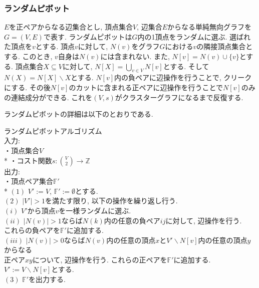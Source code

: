 \documentclass[10.5,a4paper,titlepage, dvipdfmx]{bxjsarticle}
\begin{document}
\subsubsection{ランダムピボット}
$E$を正ペアからなる辺集合とし, 頂点集合$V$, 辺集合$E$からなる単純無向グラフを$G=(V,E)$で表す.
ランダムピボットは$G$内の1頂点をランダムに選ぶ.
選ばれた頂点を$v$とする.
頂点$v$に対して, $N(v)$をグラフ$G$における$v$の隣接頂点集合とする.
このとき, $v$自身は$N(v)$には含まれない.
また, $N[v]= N(v) \cup \{v\}$とする.
頂点集合$X \subseteq V$に対して, $N[X] = \bigcup_{v \in V} N[v]$とする. そして$N(X) = N[X] \backslash X$とする.
$N[v]$内の負ペアに辺操作を行うことで, クリークにする.
その後$N[v]$のカットに含まれる正ペアに辺操作を行うことで$N[v]$のみの連結成分ができる.
これを$(V,s)$がクラスターグラフになるまで反復する.\par
ランダムピボットの詳細は以下のとおりである.
\begin{screen}
    $\textbf{ランダムピボットアルゴリズム}$ \\
    入力: \\
    \hspace{15pt} ・頂点集合$V$\\*
    \hspace{15pt} ・コスト関数$s:\binom{V}{2} \rightarrow \mathbb{Z}$\\
    出力: \\
    \hspace{15pt} ・頂点ペア集合$\mathbb{F'}$\\*
    $(1)$ $V':=V$, $\mathbb{F'}:= \emptyset$とする.\\
    $(2)$ $|V'| > 1$を満たす限り, 以下の操作を繰り返し行う.\\
    \hspace{15pt} $(i)$ $V'$から頂点$v$を一様ランダムに選ぶ.\\
    \hspace{15pt} $(ii)$ $|N(v)| > 1$ならば$N(k)$内の任意の負ペア$ij$に対して, 辺操作を行う.\\
    \hspace{15pt} \hspace{15pt} これらの負ペアを$\mathbb{F'}$に追加する.\\
    \hspace{15pt} $(iii)$ $|N(v)|>0$ならば$N(v)$内の任意の頂点$x$と$V' \backslash N[v]$内の任意の頂点$y$からなる\\
    \hspace{15pt} \hspace{15pt} 正ペア$xy$について, 辺操作を行う. これらの正ペアを$\mathbb{F'}$に追加する. $V':=V \backslash N[v]$とする.\\
    $(3)$ $\mathbb{F'}$を出力する.
\end{screen}
\end{document}
